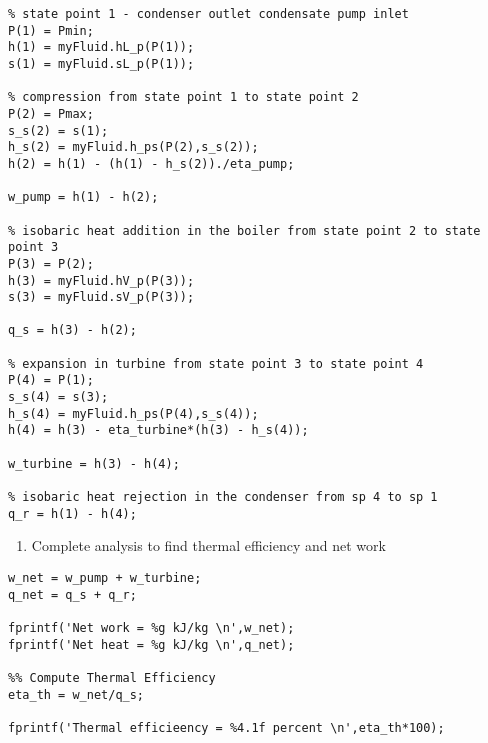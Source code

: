 \begin{lstlisting}[caption=Find fluid properties for each state point in a simple Rankine cycle.]
%% calculate properties at state points 
% state point 1 - condenser outlet condensate pump inlet
P(1) = Pmin;
h(1) = myFluid.hL_p(P(1));
s(1) = myFluid.sL_p(P(1));

% compression from state point 1 to state point 2
P(2) = Pmax;
s_s(2) = s(1);
h_s(2) = myFluid.h_ps(P(2),s_s(2));
h(2) = h(1) - (h(1) - h_s(2))./eta_pump;

w_pump = h(1) - h(2);

% isobaric heat addition in the boiler from state point 2 to state point 3
P(3) = P(2);
h(3) = myFluid.hV_p(P(3));
s(3) = myFluid.sV_p(P(3));

q_s = h(3) - h(2);

% expansion in turbine from state point 3 to state point 4
P(4) = P(1);
s_s(4) = s(3);
h_s(4) = myFluid.h_ps(P(4),s_s(4));
h(4) = h(3) - eta_turbine*(h(3) - h_s(4));

w_turbine = h(3) - h(4);

% isobaric heat rejection in the condenser from sp 4 to sp 1
q_r = h(1) - h(4);
\end{lstlisting}
\begin{enumerate}[resume]
\item Complete analysis to find thermal efficiency and net work
\end{enumerate}
\begin{lstlisting}[caption=Analyze for net work and thermal efficiency]
%% First Law Check
w_net = w_pump + w_turbine;
q_net = q_s + q_r;

fprintf('Net work = %g kJ/kg \n',w_net);
fprintf('Net heat = %g kJ/kg \n',q_net);

%% Compute Thermal Efficiency
eta_th = w_net/q_s;

fprintf('Thermal efficieency = %4.1f percent \n',eta_th*100);
\end{lstlisting}

